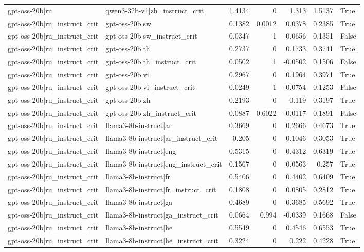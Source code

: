 \begin{table}
\begin{tabular}{l l r r r r l}
gpt-oss-20b|ru & qwen3-32b-v1|zh_instruct_crit & 1.4134 & 0 & 1.313 & 1.5137 & True \\
gpt-oss-20b|ru_instruct_crit & gpt-oss-20b|sw & 0.1382 & 0.0012 & 0.0378 & 0.2385 & True \\
gpt-oss-20b|ru_instruct_crit & gpt-oss-20b|sw_instruct_crit & 0.0347 & 1 & -0.0656 & 0.1351 & False \\
gpt-oss-20b|ru_instruct_crit & gpt-oss-20b|th & 0.2737 & 0 & 0.1733 & 0.3741 & True \\
gpt-oss-20b|ru_instruct_crit & gpt-oss-20b|th_instruct_crit & 0.0502 & 1 & -0.0502 & 0.1506 & False \\
gpt-oss-20b|ru_instruct_crit & gpt-oss-20b|vi & 0.2967 & 0 & 0.1964 & 0.3971 & True \\
gpt-oss-20b|ru_instruct_crit & gpt-oss-20b|vi_instruct_crit & 0.0249 & 1 & -0.0754 & 0.1253 & False \\
gpt-oss-20b|ru_instruct_crit & gpt-oss-20b|zh & 0.2193 & 0 & 0.119 & 0.3197 & True \\
gpt-oss-20b|ru_instruct_crit & gpt-oss-20b|zh_instruct_crit & 0.0887 & 0.6022 & -0.0117 & 0.1891 & False \\
gpt-oss-20b|ru_instruct_crit & llama3-8b-instruct|ar & 0.3669 & 0 & 0.2666 & 0.4673 & True \\
gpt-oss-20b|ru_instruct_crit & llama3-8b-instruct|ar_instruct_crit & 0.205 & 0 & 0.1046 & 0.3053 & True \\
gpt-oss-20b|ru_instruct_crit & llama3-8b-instruct|eng & 0.5315 & 0 & 0.4312 & 0.6319 & True \\
gpt-oss-20b|ru_instruct_crit & llama3-8b-instruct|eng_instruct_crit & 0.1567 & 0 & 0.0563 & 0.257 & True \\
gpt-oss-20b|ru_instruct_crit & llama3-8b-instruct|fr & 0.5406 & 0 & 0.4402 & 0.6409 & True \\
gpt-oss-20b|ru_instruct_crit & llama3-8b-instruct|fr_instruct_crit & 0.1808 & 0 & 0.0805 & 0.2812 & True \\
gpt-oss-20b|ru_instruct_crit & llama3-8b-instruct|ga & 0.4689 & 0 & 0.3685 & 0.5692 & True \\
gpt-oss-20b|ru_instruct_crit & llama3-8b-instruct|ga_instruct_crit & 0.0664 & 0.994 & -0.0339 & 0.1668 & False \\
gpt-oss-20b|ru_instruct_crit & llama3-8b-instruct|he & 0.5549 & 0 & 0.4546 & 0.6553 & True \\
gpt-oss-20b|ru_instruct_crit & llama3-8b-instruct|he_instruct_crit & 0.3224 & 0 & 0.222 & 0.4228 & True \\

\end{tabular}
\end{table}
